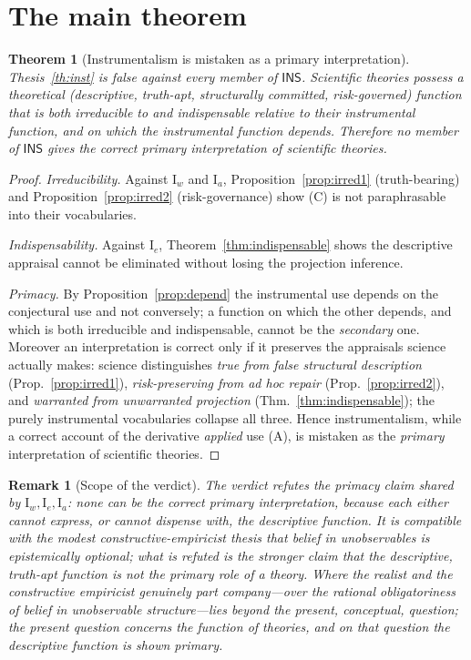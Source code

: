 \documentclass{amsart}
\theoremstyle{definition}
\theoremstyle{plain}
\newtheorem{theorem}{Theorem}
\newtheorem{remark}{Remark}
\begin{document}
\section{The main theorem}

\begin{theorem}[Instrumentalism is mistaken as a primary
interpretation]\label{thm:main}
Thesis~\textup{\ref{th:inst}} is false against every member of $\mathsf{INS}$.
Scientific theories possess a theoretical (descriptive, truth-apt, structurally
committed, risk-governed) function that is both \emph{irreducible} to and
\emph{indispensable} relative to their instrumental function, and on which the
instrumental function depends. Therefore no member of $\mathsf{INS}$ gives the
correct primary interpretation of scientific theories.
\end{theorem}

\begin{proof}
\emph{Irreducibility.} Against $\mathrm I_w$ and $\mathrm I_a$,
Proposition~\ref{prop:irred1} (truth-bearing) and
Proposition~\ref{prop:irred2} (risk-governance) show (C) is not paraphrasable
into their vocabularies.

\emph{Indispensability.} Against $\mathrm I_e$,
Theorem~\ref{thm:indispensable} shows the descriptive appraisal cannot be
eliminated without losing the projection inference.

\emph{Primacy.} By Proposition~\ref{prop:depend} the instrumental use depends on
the conjectural use and not conversely; a function on which the other depends,
and which is both irreducible and indispensable, cannot be the \emph{secondary}
one. Moreover an interpretation is correct only if it preserves the appraisals
science actually makes: science distinguishes \emph{true from false structural
description} (Prop.~\ref{prop:irred1}), \emph{risk-preserving from ad hoc
repair} (Prop.~\ref{prop:irred2}), and \emph{warranted from unwarranted
projection} (Thm.~\ref{thm:indispensable}); the purely instrumental
vocabularies collapse all three. Hence instrumentalism, while a correct account
of the derivative \emph{applied} use (A), is mistaken as the \emph{primary}
interpretation of scientific theories.
\end{proof}

\begin{remark}[Scope of the verdict]\label{rem:scope}
The verdict refutes the \emph{primacy} claim shared by $\mathrm I_w,\mathrm
I_e,\mathrm I_a$: none can be the correct primary interpretation, because each
either cannot express, or cannot dispense with, the descriptive function. It is
compatible with the modest constructive-empiricist thesis that \emph{belief} in
unobservables is epistemically optional; what is refuted is the stronger claim
that the descriptive, truth-apt function is not the \emph{primary} role of a
theory. Where the realist and the constructive empiricist genuinely part
company---over the \emph{rational obligatoriness} of belief in unobservable
structure---lies beyond the present, conceptual, question; the present question
concerns the \emph{function} of theories, and on that question the descriptive
function is shown primary.
\end{remark}
\end{document}
